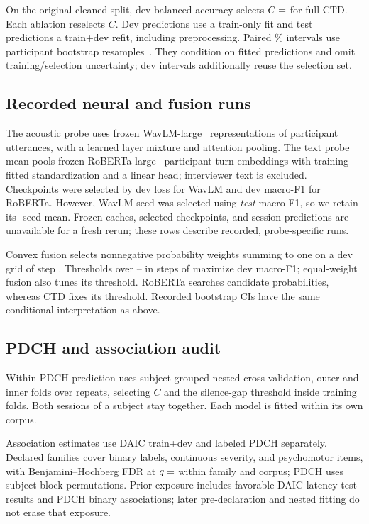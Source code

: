 \documentclass{article}
\begin{document}
On the original cleaned split, dev balanced accuracy selects $C=\R{fitC}$ for full CTD. Each ablation reselects $C$. Dev predictions use a train-only fit and test predictions a train+dev refit, including preprocessing. Paired \% intervals use  participant bootstrap resamples~\cite{ferrer2024confidence}. They condition on fitted predictions and omit training/selection uncertainty; dev intervals additionally reuse the selection set.

\subsection{Recorded neural and fusion runs}
The acoustic probe uses frozen WavLM-large~\cite{chen2022wavlm} representations of participant utterances, with a learned layer mixture and attention pooling. The text probe mean-pools frozen RoBERTa-large~\cite{liu2019roberta} participant-turn embeddings with training-fitted standardization and a linear head; interviewer text is excluded. Checkpoints were selected by dev loss for WavLM and dev macro-F1 for RoBERTa. However, WavLM seed  was selected using \emph{test} macro-F1, so we retain its -seed mean. Frozen caches, selected checkpoints, and session predictions are unavailable for a fresh rerun; these rows describe recorded, probe-specific runs.

Convex fusion selects nonnegative probability weights summing to one on a dev grid of step . Thresholds over -- in steps of  maximize dev macro-F1; equal-weight fusion also tunes its threshold. RoBERTa searches candidate probabilities, whereas CTD fixes its threshold. Recorded bootstrap CIs have the same conditional interpretation as above.

\subsection{PDCH and association audit}
Within-PDCH prediction uses subject-grouped nested cross-validation,  outer and  inner folds over  repeats, selecting $C$ and the silence-gap threshold inside training folds. Both sessions of a subject stay together. Each model is fitted within its own corpus.

Association estimates use DAIC train+dev and labeled PDCH separately. Declared families cover binary labels, continuous severity, and psychomotor items, with Benjamini--Hochberg FDR at $q=\R{fdr}$ within family and corpus; PDCH uses  subject-block permutations. Prior exposure includes favorable DAIC latency test results and PDCH binary associations; later pre-declaration and nested fitting do not erase that exposure.
\end{document}
